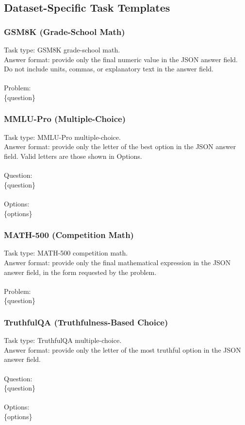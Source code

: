 \subsection{Dataset-Specific Task Templates}

\subsubsection{GSM8K (Grade-School Math)}

\begin{prompt}
Task type: GSM8K grade-school math.\\
Answer format: provide only the final numeric value in the JSON answer field. Do not include units, commas, or explanatory text in the answer field.\\
\\
Problem:\\
\{question\}
\end{prompt}

\subsubsection{MMLU-Pro (Multiple-Choice)}

\begin{prompt}
Task type: MMLU-Pro multiple-choice.\\
Answer format: provide only the letter of the best option in the JSON answer field. Valid letters are those shown in Options.\\
\\
Question:\\
\{question\}\\
\\
Options:\\
\{options\}
\end{prompt}

\subsubsection{MATH-500 (Competition Math)}

\begin{prompt}
Task type: MATH-500 competition math.\\
Answer format: provide only the final mathematical expression in the JSON answer field, in the form requested by the problem.\\
\\
Problem:\\
\{question\}
\end{prompt}



\subsubsection{TruthfulQA (Truthfulness-Based Choice)}

\begin{prompt}
Task type: TruthfulQA multiple-choice.\\
Answer format: provide only the letter of the most truthful option in the JSON answer field.\\
\\
Question:\\
\{question\}\\
\\
Options:\\
\{options\}
\end{prompt}

